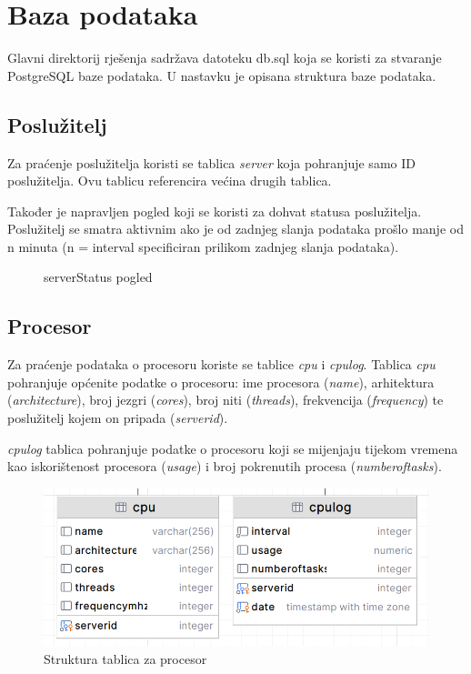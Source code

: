 \documentclass[zavrsnirad]{fer}
\begin{document}
\chapter{Baza podataka}
Glavni direktorij rješenja sadržava datoteku db.sql koja se koristi za stvaranje PostgreSQL baze podataka. U nastavku je opisana struktura baze podataka.

\section{Poslužitelj}
Za praćenje poslužitelja koristi se tablica \textit{server} koja pohranjuje samo ID poslužitelja. Ovu tablicu referencira većina drugih tablica.

Također je napravljen pogled koji se koristi za dohvat statusa poslužitelja. Poslužitelj se smatra aktivnim ako je od zadnjeg slanja podataka prošlo manje od n minuta (n = interval specificiran prilikom zadnjeg slanja podataka).

\begin{figure}[htb]
	\centering
	
	\caption{serverStatus pogled}
\end{figure}
\FloatBarrier

\section{Procesor}
Za praćenje podataka o procesoru koriste se tablice \textit{cpu} i \textit{cpulog}. Tablica \textit{cpu} pohranjuje općenite podatke o procesoru: ime procesora (\textit{name}), arhitektura (\textit{architecture}), broj jezgri (\textit{cores}), broj niti (\textit{threads}), frekvencija (\textit{frequency}) te poslužitelj kojem on pripada (\textit{serverid}).

\textit{cpulog} tablica pohranjuje podatke o procesoru koji se mijenjaju tijekom vremena kao iskorištenost procesora (\textit{usage}) i broj pokrenutih procesa (\textit{numberoftasks}).

\begin{figure}[htb!]
	\centering
	\includegraphics[width=0.65\linewidth]{images/db_cpu.png} 
	\caption{Struktura tablica za procesor}
\end{figure}
\FloatBarrier
\end{document}
